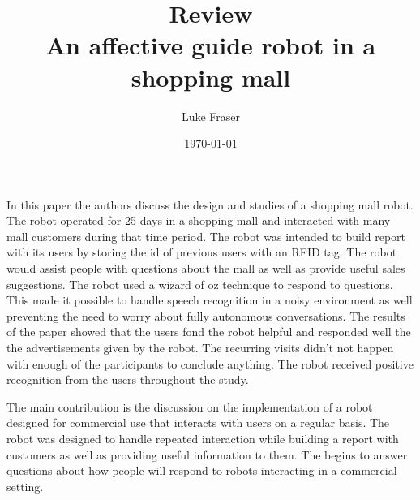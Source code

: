 \documentclass{article}
\begin{document}
\title{{\large Review} \\ An affective guide robot in a shopping mall}
\author{Luke Fraser}
\date{\today}
\maketitle

\begingroup
\renewcommand{\section}[2]{}


\endgroup

\section*{Summary}
In this paper the authors discuss the design and studies of a shopping mall robot. The robot operated for 25 days in a shopping mall and interacted with many mall customers during that time period. The robot was intended to build report with its users by storing the id of previous users with an RFID tag. The robot would assist people with questions about the mall as well as provide useful sales suggestions. The robot used a wizard of oz technique to respond to questions. This made it possible to handle speech recognition in a noisy environment as well preventing the need to worry about fully autonomous conversations. The results of the paper showed that the users fond the robot helpful and responded well the the advertisements given by the robot. The recurring visits didn't not happen with enough of the participants to conclude anything. The robot received positive recognition from the users throughout the study.
\section*{Strengths}
The main contribution is the discussion on the implementation of a robot designed for commercial use that interacts with users on a regular basis. The robot was designed to handle repeated interaction while building a report with customers as well as providing useful information to them. The begins to answer questions about how people will respond to robots interacting in a commercial setting.
\end{document}
